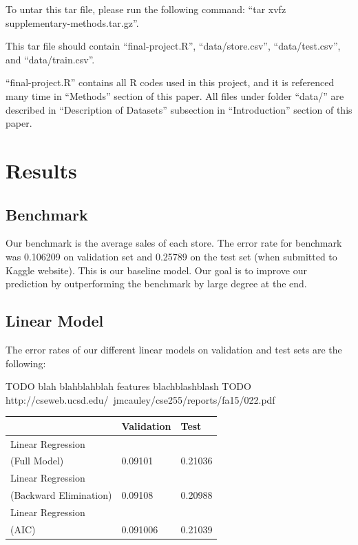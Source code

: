 \documentclass[letterpaper,twocolumn,11pt]{article}
\begin{document}
To untar this tar file, please run the following command: ``tar xvfz supplementary-methods.tar.gz''.

This tar file should contain ``final-project.R'', ``data/store.csv'', ``data/test.csv'', and ``data/train.csv''.

``final-project.R'' contains all R codes used in this project, and it is referenced many time in ``Methods'' section of this paper. All files under folder ``data/'' are described in ``Description of Datasets'' subsection in ``Introduction'' section of this paper.

\section{Results}
\subsection{Benchmark}
Our benchmark is the average sales of each store. The error rate for benchmark was 0.106209 on validation set and 0.25789 on the test set (when submitted to Kaggle website). This is our baseline model. Our goal is to improve our prediction by outperforming the benchmark by large degree at the end. 

\subsection{Linear Model}
The error rates of our different linear models on validation and test sets are the following:

TODO blah blahblahblah features blachblashblash 
TODO http://cseweb.ucsd.edu/~jmcauley/cse255/reports/fa15/022.pdf

\begin{center}
    \begin{tabular}{| l | l | l |}
      \hline
       & Validation & Test \\ \hline
      Linear Regression \\
      (Full Model) & 0.09101 & 0.21036 \\ \hline
      Linear Regression \\
      (Backward Elimination) & 0.09108 & 0.20988 \\ \hline
      Linear Regression \\
      (AIC) & 0.091006 & 0.21039 \\ \hline
      \hline    
    \end{tabular}
\end{center}
\end{document}
